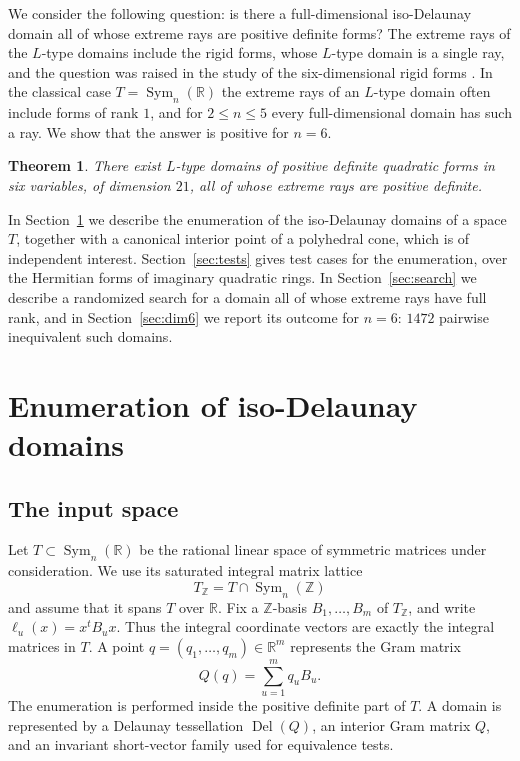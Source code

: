 \documentclass{amsart}
\newtheorem{theorem}{Theorem}
\newcommand{\Sym}{\operatorname{Sym}}
\newcommand{\Del}{\operatorname{Del}}
\newcommand{\ZZ}{\mathbb{Z}}
\newcommand{\RR}{\mathbb{R}}
\begin{document}
We consider the following question: is there a full-dimensional iso-Delaunay
domain all of whose extreme rays are positive definite forms?  The extreme
rays of the \(L\)-type domains include the rigid forms, whose \(L\)-type
domain is a single ray, and the question was raised in the study of the
six-dimensional rigid forms \cite{DutourVallentin2005}.  In the
classical case \(T=\Sym_n(\RR)\) the extreme rays of an \(L\)-type domain often
include forms of rank \(1\), and for \(2\leq n\leq 5\) every full-dimensional
domain has such a ray.  We show that the answer is positive for \(n=6\).

\begin{theorem}
There exist \(L\)-type domains of positive definite quadratic forms in six
variables, of dimension \(21\), all of whose extreme rays are positive
definite.
\end{theorem}

In Section~\ref{sec:enum} we describe the enumeration of the iso-Delaunay
domains of a space \(T\), together with a canonical interior point of a
polyhedral cone, which is of independent interest.  Section~\ref{sec:tests}
gives test cases for the enumeration, over the Hermitian forms of imaginary
quadratic rings.  In Section~\ref{sec:search} we describe a randomized search
for a domain all of whose extreme rays have full rank, and in
Section~\ref{sec:dim6} we report its outcome for \(n=6\): \(1472\)
pairwise inequivalent such domains.

\section{Enumeration of iso-Delaunay domains}\label{sec:enum}

\subsection{The input space}

Let \(T \subset \Sym_n(\RR)\) be the rational linear space of symmetric
matrices under consideration.  We use its saturated integral matrix lattice
\begin{equation}
  T_{\ZZ}=T\cap\Sym_n(\ZZ)
\end{equation}
and assume that it spans \(T\) over \(\RR\).  Fix a \(\ZZ\)-basis
\(B_1,\ldots,B_m\) of \(T_{\ZZ}\), and write
\(\ell_u(x)=x^{t}B_u x\).  Thus the integral coordinate vectors are exactly
the integral matrices in \(T\).  A point
\(q=(q_1,\ldots,q_m)\in\RR^m\) represents the Gram matrix
\begin{equation}
  Q(q)=\sum_{u=1}^{m} q_u B_u .
\end{equation}
The enumeration is performed inside the positive definite part of \(T\).  A
domain is represented by a Delaunay tessellation \(\Del(Q)\), an interior Gram
matrix \(Q\), and an invariant short-vector family used for equivalence tests.
\end{document}

